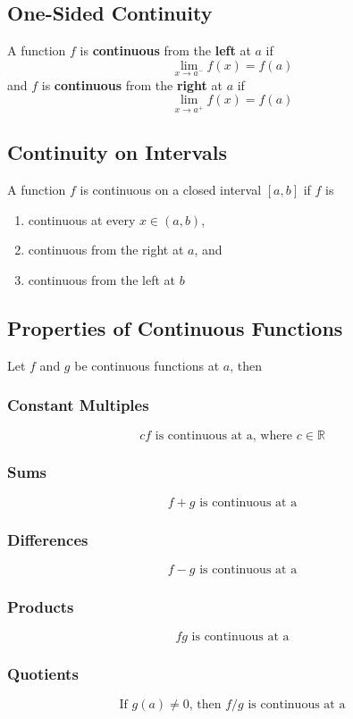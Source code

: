 \documentclass[../ma2002_notes.tex]{subfiles}
\begin{document}
\subsection{One-Sided Continuity}
A function \(f\) is \textbf{continuous} from the \textbf{left} at \(a\) if
\[\lim_{x\to a^-}f(x)=f(a)\]
and \(f\) is \textbf{continuous} from the \textbf{right} at \(a\) if
\[\lim_{x\to a^+}f(x)=f(a)\]

\subsection{Continuity on Intervals}
A function \(f\) is continuous on a closed interval \([a,b]\) if \(f\) is
\begin{enumerate}
	\item continuous at every \(x\in(a,b)\),
	\item continuous from the right at \(a\), and
	\item continuous from the left at \(b\)
\end{enumerate}

\subsection{Properties of Continuous Functions}
Let \(f\) and \(g\) be continuous functions at \(a\), then

\subsubsection{Constant Multiples}
\[cf\text{ is continuous at a, where }c\in\mathbb{R}\]

\subsubsection{Sums}
\[f+g\text{ is continuous at a}\]

\subsubsection{Differences}
\[f-g\text{ is continuous at a}\]

\subsubsection{Products}
\[fg\text{ is continuous at a}\]

\subsubsection{Quotients}
\[\text{If } g(a)\ne0\text{, then }f/g\text{ is continuous at a}\]
\end{document}
